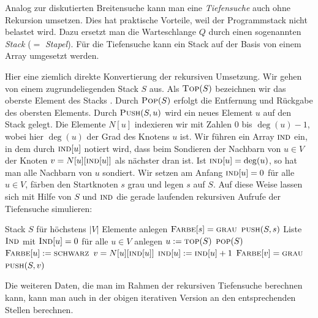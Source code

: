 \begin{bem}
	Analog zur diskutierten Breitensuche kann man eine \emph{Tiefensuche} auch ohne Rekursion umsetzen.
	Dies hat praktische Vorteile, weil der Programmstack nicht  belastet wird.
	Dazu ersetzt man die Warteschlange $Q$ durch einen sogenannten \emph{Stack} ($=$ \emph{Stapel}). Für die Tiefensuche kann ein Stack auf der Basis von einem Array umgesetzt werden. 
	
	Hier eine ziemlich direkte Konvertierung der rekursiven Umsetzung. Wir gehen von einem zugrundeliegenden Stack $S$ aus. Als $\mathop{\text{\textsc{Top}}}(S)$ bezeichnen wir das oberste Element des Stacks . Durch $\mathop{\text{\textsc{Pop}}}(S)$ erfolgt die Entfernung und Rückgabe des obersten Elements. Durch $\mathop{\text{\textsc{Push}}}(S,u)$ wird ein neues Element $u$ auf den Stack gelegt. Die Elemente $N[u]$ indexieren wir mit Zahlen $0$ bis $\deg(u)-1$, wobei hier $\deg(u)$ der Grad des Knotens $u$ ist. Wir führen ein Array $\mathop{\text{\textsc{ind}}}$ ein, in dem durch $\mathop{\text{\textsc{ind}}}[u]$ notiert wird, dass beim Sondieren der Nachbarn von $u \in V$  der Knoten $v=N[u][\mathop{\text{\textsc{ind}}}[u]]$ als  nächster dran ist. Ist $\mathop{\text{\textsc{ind}}}[u]= \deg(u)$, so hat man alle Nachbarn von $u$ sondiert. Wir setzen am Anfang $\mathop{\text{\textsc{ind}}}[u]=0$ für alle $u \in V$, färben den Startknoten $s$ grau und legen $s$ auf $S$. Auf diese Weise lassen sich mit Hilfe von $S$ und $\mathop{\text{\textsc{ind}}}$ die gerade laufenden rekursiven Aufrufe der Tiefensuche simulieren: 
	
	\begin{algorithm}[H]
		\caption{$\cc{Tiefensuche-mit-Stack}(s)$} 
		\begin{algorithmic}[1]
			\STATE Stack $S$ für höchstens $|V|$ Elemente anlegen
			\STATE $\mathop{\text{\textsc{Farbe}}}[s] = \mathop{\text{\textsc{grau}}}$ 
			\STATE $\mathop{\text{\textsc{push}}}(S,s)$
			\STATE Liste $\mathop{\text{\textsc{Ind}}}$  mit $\mathop{\text{\textsc{Ind}}}[u]=0$ für alle $u \in V$ anlegen
			\STATE $u:= \mathop{\text{\textsc{top}}}(S)$ \quad {}
			\STATE $\mathop{\text{\textsc{pop}}}(S)$   \quad {}
			\STATE $\mathop{\text{\textsc{Farbe}}}[u] := \mathop{\text{\textsc{schwarz}}}$
			\ELSE
			\STATE $v=N[u][\mathop{\text{\textsc{ind}}}[u]]$ \quad {} 
			\STATE $\mathop{\text{\textsc{ind}}}[u]:=\mathop{\text{\textsc{ind}}}[u]+1$				
			\STATE $\mathop{\text{\textsc{Farbe}}}[v] = \mathop{\text{\textsc{grau}}}$ \quad {}
			\STATE $\mathop{\text{\textsc{push}}}(S,v)$ \quad {}
			\ENDIF 
			\ENDIF 
			\ENDWHILE  
		\end{algorithmic}
	\end{algorithm}
	
	Die weiteren Daten, die man im Rahmen der rekursiven Tiefensuche berechnen kann, kann man auch in der obigen iterativen Version an den entsprechenden Stellen berechnen. 
\end{bem}

